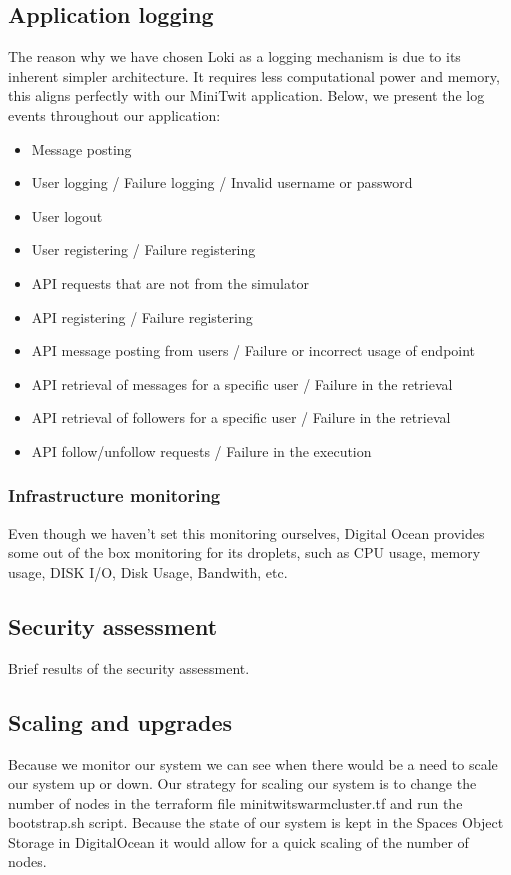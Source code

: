 \subsection{Application logging}
The reason why we have chosen Loki as a logging mechanism is due to its inherent simpler architecture. It requires less computational power and memory, this aligns perfectly with our MiniTwit application.
Below, we present the log events throughout our application:
\begin{itemize}
    \item Message posting
    \item User logging / Failure logging / Invalid username or password
    \item User logout
    \item User registering / Failure registering
    \item API requests that are not from the simulator
    \item API registering / Failure registering
    \item API message posting from users / Failure or incorrect usage of endpoint
    \item API retrieval of messages for a specific user / Failure in the retrieval
    \item API retrieval of followers for a specific user / Failure in the retrieval
    \item API follow/unfollow requests / Failure in the execution
    
\end{itemize}

\subsubsection{Infrastructure monitoring}
Even though we haven't set this monitoring ourselves, Digital Ocean provides some out of the box monitoring for its droplets, such as CPU usage, memory usage, DISK I/O, Disk Usage, Bandwith, etc.

\subsection{Security assessment}
Brief results of the security assessment.


\subsection{Scaling and upgrades}
Because we monitor our system we can see when there would be a need to scale our system up or down. Our strategy for scaling our system is to change the number of nodes in the terraform file minitwit\textunderscore swarm\textunderscore cluster.tf and run the bootstrap.sh script. Because the state of our system is kept in the Spaces Object Storage in DigitalOcean it would allow for a quick scaling of the number of nodes. 

